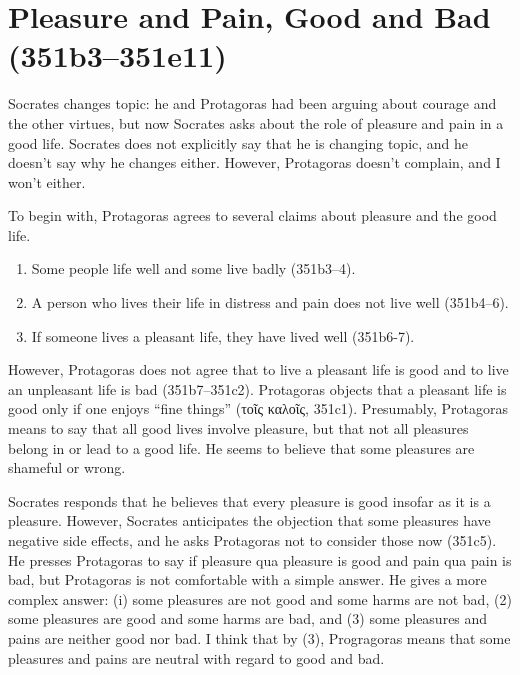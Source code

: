 \documentclass[12pt,letterpaper]{article}
\begin{document}

\pagestyle{notes}

\section*{Pleasure and Pain, Good and Bad (351b3--351e11)}

Socrates changes topic: he and Protagoras had been arguing about courage and the other virtues, but now Socrates asks about the role of pleasure and pain in a good life.
Socrates does not explicitly say that he is changing topic, and he doesn't say why he changes either.
However, Protagoras doesn't complain, and I won't either.

To begin with, Protagoras agrees to several claims about pleasure and the good life.

\begin{enumerate}
    \item Some people life well and some live badly (351b3--4).
    \item A person who lives their life in distress and pain does not live well (351b4--6).
    \item If someone lives a pleasant life, they have lived well (351b6-7).
\end{enumerate}

However, Protagoras does not agree that to live a pleasant life is good and to live an unpleasant life is bad (351b7--351c2).
Protagoras objects that a pleasant life is good only if one enjoys ``fine things'' (\textgreek{τοῖς καλοῖς}, 351c1).
Presumably, Protagoras means to say that all good lives involve pleasure, but that not all pleasures belong in or lead to a good life.
He seems to believe that some pleasures are shameful or wrong.

Socrates responds that he believes that every pleasure is good insofar as it is a pleasure.
However, Socrates anticipates the objection that some pleasures have negative side effects, and he asks Protagoras not to consider those now (351c5).
He presses Protagoras to say if pleasure qua pleasure is good and pain qua pain is bad, but Protagoras is not comfortable with a simple answer.
He gives a more complex answer: (i) some pleasures are not good and some harms are not bad, (2) some pleasures are good and some harms are bad, and (3) some pleasures and pains are neither good nor bad.
I think that by (3), Progragoras means that some pleasures and pains are neutral with regard to good and bad.
\end{document}
